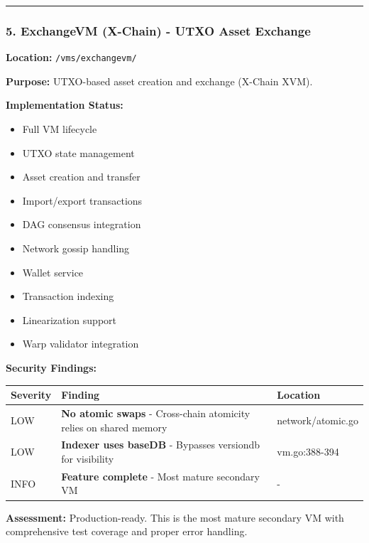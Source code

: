 \documentclass[
]{article}
\newcounter{none} %
\providecommand{\tightlist}{%
  \setlength{\itemsep}{0pt}\setlength{\parskip}{0pt}}
\begin{document}
\begin{center}\rule{0.5\linewidth}{0.5pt}\end{center}

\subsubsection{5. ExchangeVM (X-Chain) - UTXO Asset
Exchange}\label{5-exchangevm-x-chain---utxo-asset-exchange}

\textbf{Location:} \texttt{/vms/exchangevm/}

\textbf{Purpose:} UTXO-based asset creation and exchange (X-Chain XVM).

\textbf{Implementation Status:}

\begin{itemize}
\tightlist
\item[$\boxtimes$]
  Full VM lifecycle
\item[$\boxtimes$]
  UTXO state management
\item[$\boxtimes$]
  Asset creation and transfer
\item[$\boxtimes$]
  Import/export transactions
\item[$\boxtimes$]
  DAG consensus integration
\item[$\boxtimes$]
  Network gossip handling
\item[$\boxtimes$]
  Wallet service
\item[$\boxtimes$]
  Transaction indexing
\item[$\boxtimes$]
  Linearization support
\item[$\boxtimes$]
  Warp validator integration
\end{itemize}

\textbf{Security Findings:}

{\def\LTcaptype{none} %
\begin{longtable}[]{@{}lll@{}}
\toprule\noalign{}
Severity & Finding & Location \\
\midrule\noalign{}
\endhead
\bottomrule\noalign{}
\endlastfoot
LOW & \textbf{No atomic swaps} - Cross-chain atomicity relies on shared
memory & network/atomic.go \\
LOW & \textbf{Indexer uses baseDB} - Bypasses versiondb for visibility &
vm.go:388-394 \\
INFO & \textbf{Feature complete} - Most mature secondary VM & - \\
\end{longtable}
}

\textbf{Assessment:} Production-ready. This is the most mature secondary
VM with comprehensive test coverage and proper error handling.
\end{document}
